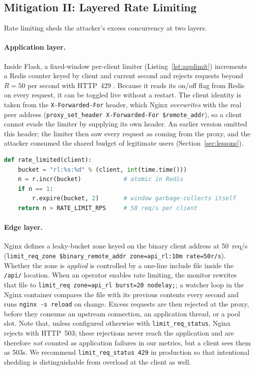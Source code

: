 \subsection{Mitigation II: Layered Rate Limiting}
\label{sec:design-rl}
Rate limiting sheds the attacker's excess concurrency at two layers.

\paragraph{Application layer.} Inside Flask, a fixed-window per-client limiter
(Listing~\ref{lst:applimit}) increments a Redis counter keyed by client and current
second and rejects requests beyond $R=50$ per second with HTTP~429
\cite{rfc6585}. Because it reads its on/off flag from Redis on every request, it can be
toggled live without a restart. The client identity is taken from the
\texttt{X-Forwarded-For} header, which Nginx \emph{overwrites} with the real peer
address (\texttt{proxy\_set\_header X-Forwarded-For \$remote\_addr}), so a client cannot
evade the limiter by supplying its own header. An earlier version omitted this header;
the limiter then saw every request as coming from the proxy, and the attacker consumed
the shared budget of legitimate users (Section~\ref{sec:lessons}).

\begin{lstlisting}[language=Python, caption={Application-layer fixed-window limiter (\texttt{backend/app.py}).}, label={lst:applimit}]
def rate_limited(client):
    bucket = "rl:%s:%d" % (client, int(time.time()))
    n = r.incr(bucket)            # atomic in Redis
    if n == 1:
        r.expire(bucket, 2)       # window garbage-collects itself
    return n > RATE_LIMIT_RPS     # 50 req/s per client
\end{lstlisting}

\paragraph{Edge layer.} Nginx defines a leaky-bucket zone keyed on the binary client
address at 50~req/s (\texttt{limit\_req\_zone \$binary\_remote\_addr zone=api\_rl:10m
rate=50r/s}). Whether the zone is \emph{applied} is controlled by a one-line include
file inside the \texttt{/api/} location. When an operator enables rate limiting, the
monitor rewrites that file to \texttt{limit\_req zone=api\_rl burst=20 nodelay;}; a
watcher loop in the Nginx container compares the file with its previous contents every
second and runs \texttt{nginx -s reload} on change. Excess requests are then rejected
at the proxy, before they consume an upstream connection, an application thread, or a
pool slot. Note that, unless configured otherwise with \texttt{limit\_req\_status},
Nginx rejects with HTTP~503; these rejections never reach the application and are
therefore \emph{not} counted as application failures in our metrics, but a client sees
them as 503s. We recommend \texttt{limit\_req\_status 429} in production so that
intentional shedding is distinguishable from overload at the client as well.

